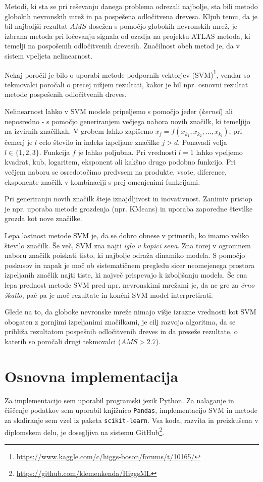 \documentclass[11pt,a4paper,openany]{book}
\begin{document}
Metodi, ki sta se pri reševanju danega problema odrezali najbolje, sta bili metodo globokih nevronskih mrež in pa pospešena odločitvena drevesa. Kljub temu, da je bil najboljši rezultat $AMS$ dosežen s pomočjo globokih nevronskih mrež, je izbrana metoda pri ločevanju signala od ozadja na projektu ATLAS metoda, ki temelji na pospošenih odločitvenih drevesih. Značilnost obeh metod je, da v sistem vpeljeta nelinearnost. 

Nekaj poročil je bilo o uporabi metode podpornih vektorjev (SVM)\footnote{\url{https://www.kaggle.com/c/higgs-boson/forums/t/10165/}}, vendar so tekmovalci poročali o precej nižjem rezultati, kakor je bil npr. osnovni rezultat metode pospešenih odločitvenih dreves.

Nelinearnost lahko v SVM modele pripeljemo s pomočjo jeder (\textit{kernel}) ali neposredno - s pomočjo generiranjem večjega nabora novih značilk, ki temeljijo na izvirnih značilkah. V grobem lahko zapišemo $x_j = f(x_{k_1}, x_{k_2}, ..., x_{k_l})$, pri čemerj je $l$ celo število in indeks izpeljane značilke $j > d$. Ponavadi velja $l \in \{1, 2, 3\}$. Funkcija $f$ je lahko poljubna. Pri vrednosti $l = 1$ lahko vpeljemo kvadrat, kub, logaritem, eksponent ali kakšno drugo podobno funkcijo. Pri večjem naboru se osredotočimo predvsem na produkte, vsote, diference, eksponente značilk v kombinaciji s prej omenjenimi funkcijami. 

Pri generiranju novih značilk šteje iznajdljivost in inovativnost. Zanimiv pristop je npr. uporaba metode grozdenja (npr. KMeans) in uporaba zaporedne številke grozda kot nove značilke.

Lepa lastnost metode SVM je, da se dobro obnese v primerih, ko imamo veliko število značilk. Še več, SVM zna najti \textit{iglo v kopici sena}. Zna torej v ogromnem naboru značilk poiskati tisto, ki najbolje odraža dinamiko modela. S pomočjo poskusov in napak je moč ob sistematičnem pregledu sicer neomejenega prostora izpeljanih značlik najti tiste, ki največ prispevajo k izboljšanju modela. Še ena lepa prednost metode SVM pred npr. nevronskimi mrežami je, da ne gre za \textit{črno škatlo}, pač pa je moč rezultate in končni SVM model interpretirati.

Glede na to, da globoke nevronske mreže nimajo višje izrazne vrednosti kot SVM obogaten z gornjimi izpeljanimi značilkami, je cilj razvoja algoritma, da se približa rezultatom pospešnih odločitvenih dreves in da preseže rezultate, o katerih so poročali drugi tekmovalci ($AMS > 2.7$).


\section{Osnovna implementacija}
Za implementacijo sem uporabil programski jezik Python. Za nalaganje in čiščenje podatkov sem uporabil knjižnico \texttt{Pandas}, implementacijo SVM in metode za skaliranje sem vzel iz paketa \texttt{scikit-learn}\cite{scikit-learn}. Vsa koda, razvita in preizkušena v diplomskem delu, je dosegljiva na sistemu GitHub\footnote{\url{https://github.com/klemenkenda/HiggsML}}.
\end{document}
